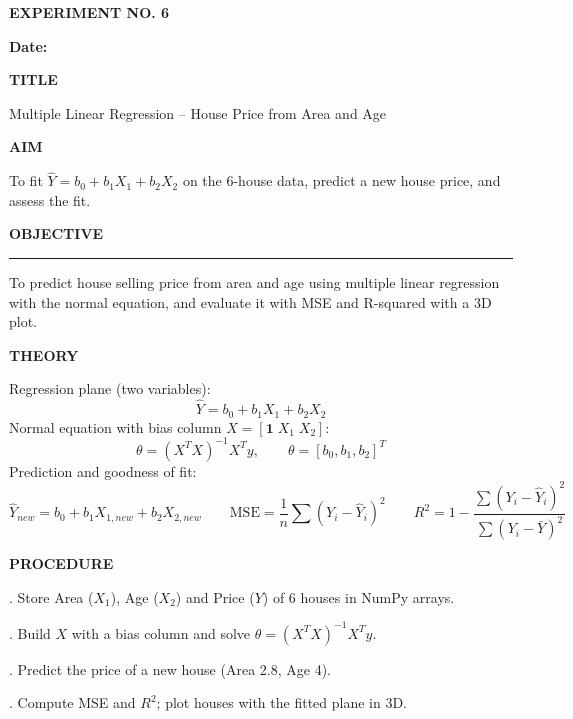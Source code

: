 \documentclass[11pt,twoside]{article}
\newcommand{\expheading}[1]{{\fontsize{14}{17}\selectfont\textbf{#1}\par}}
\newcommand{\fullrule}{\noindent\rule{\textwidth}{0.6pt}\par}
\begin{document}
\sloppy

{\setlength{\parskip}{1pt}\setlength{\abovedisplayskip}{2pt}\setlength{\belowdisplayskip}{2pt}
\begin{center}
\expheading{EXPERIMENT NO. 6}
\end{center}
\vspace{2pt}

\noindent\textbf{Date:} \underline{\hspace{2.6cm}}\par
\vspace{6pt}

\expheading{TITLE}
\vspace{4pt}
\noindent Multiple Linear Regression -- House Price from Area and Age\par
\vspace{4pt}

\expheading{AIM}
\vspace{4pt}
\noindent To fit $\hat{Y}=b_0+b_1X_1+b_2X_2$ on the 6-house data, predict a new house price, and assess the fit. \par
\vspace{4pt}

\expheading{OBJECTIVE}
\vspace{2pt}
\fullrule
\vspace{4pt}
\noindent To predict house selling price from area and age using multiple linear regression with the normal equation, and evaluate it with MSE and R-squared with a 3D plot. \par
\vspace{4pt}

\expheading{THEORY}
\vspace{4pt}
Regression plane (two variables):
\[\hat{Y}=b_0+b_1X_1+b_2X_2\]
Normal equation with bias column $X=[\mathbf{1}\;X_1\;X_2]$:
\[\theta=(X^TX)^{-1}X^Ty,\qquad \theta=[b_0,b_1,b_2]^T\]
Prediction and goodness of fit:
\[\hat{Y}_{new}=b_0+b_1X_{1,new}+b_2X_{2,new}\qquad \mathrm{MSE}=\frac{1}{n}\sum(Y_i-\hat{Y}_i)^2\qquad R^2=1-\frac{\sum(Y_i-\hat{Y}_i)^2}{\sum(Y_i-\bar{Y})^2}\]
\vspace{4pt}

\expheading{PROCEDURE}
\vspace{4pt}
. Store Area ($X_1$), Age ($X_2$) and Price ($Y$) of 6 houses in NumPy arrays.\par
{}. Build $X$ with a bias column and solve $\theta=(X^TX)^{-1}X^Ty$.\par
{}. Predict the price of a new house (Area 2.8, Age 4).\par
{}. Compute MSE and $R^2$; plot houses with the fitted plane in 3D. \par
\vspace{4pt}

}
\end{document}
